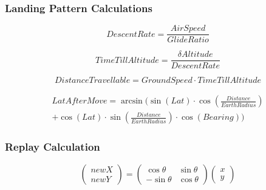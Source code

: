 \documentclass[11pt, a4paper]{article}
\begin{document}
\subsubsection*{Landing Pattern Calculations}
\begin{equation}
    Descent Rate = \frac{Air Speed}{Glide Ratio}
\end{equation}

\begin{equation}
    Time Till Altitude = \frac{\delta Altitude}{Descent Rate}
\end{equation}

\begin{equation}
    Distance Travellable = Ground Speed \cdot Time Till Altitude
\end{equation}

\begin{multline}
    LatAfterMove = \arcsin\Bigg(\sin{\left( Lat \right)} \cdot \cos{\left(\frac{Distance}{EarthRadius}\right)} \\
    + \cos{\left( Lat \right)} \cdot \sin{\left( \frac{Distance}{EarthRadius} \right)} \cdot \cos{\left( Bearing \right)}\Bigg)
\end{multline}

\subsubsection*{Replay Calculation}
\[
    \begin{pmatrix}
        newX \\ newY
    \end{pmatrix}
    =
    \begin{pmatrix}
        \cos\theta & \sin\theta \\ -\sin\theta & \cos\theta
    \end{pmatrix}
    \begin{pmatrix}
        x \\ y
    \end{pmatrix}
\]

\newpage
\printbibliography{}
\end{document}
